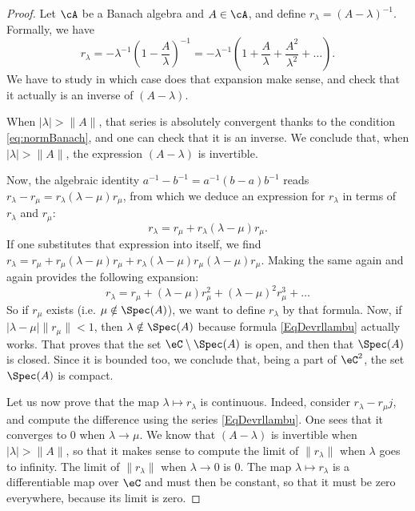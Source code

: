 \begin{proof}
	Let $\cA$ be a Banach algebra and $A\in\cA$, and define $r_{\lambda}=(A-\lambda)^{-1}$. Formally, we have
	\[ 
	  r_{\lambda}=-\lambda^{-1}\left( 1-\frac{ A }{ \lambda } \right)^{-1}=-\lambda^{-1}\left( 1+\frac{ A }{ \lambda }+\frac{ A^2 }{ \lambda^2 }+\ldots \right).
	\]
	We have to study in which case does that expansion make sense, and check that it actually is an inverse of $(A-\lambda)$. 

	When $| \lambda |>\| A \|$, that series is absolutely convergent thanks to the condition \eqref{eq:normBanach}, and one can check that it is an inverse. We conclude that, when $| \lambda |>\| A \|$, the expression $(A-\lambda)$ is invertible.

	Now, the algebraic identity $a^{-1}-b^{-1}=a^{-1}(b-a)b^{-1}$ reads $r_{\lambda}-r_{\mu}=r_{\lambda}(\lambda-\mu)r_{\mu}$, from which we deduce an expression for $r_{\lambda}$ in terms of $r_{\lambda}$ and $r_{\mu}$:
	\[ 
	  r_{\lambda}=r_{\mu}+r_{\lambda}(\lambda-\mu)r_{\mu}.
	\]
	If one substitutes that expression into itself, we find $r_{\lambda}=r_{\mu}+r_{\mu}(\lambda-\mu)r_{\mu}+r_{\lambda}(\lambda-\mu)r_{\mu}(\lambda-\mu)r_{\mu}$. Making the same again and again provides the following expansion: 
	\begin{equation}		\label{EqDevrllambu}
		r_{\lambda}=r_{\mu}+(\lambda-\mu)r_{\mu}^2+(\lambda-\mu)^2r_{\mu}^3+\ldots
	\end{equation}
	So if $r_{\mu}$ exists (i.e. $\mu\notin\Spec(A)$), we want to define $r_{\lambda}$ by that formula. Now, if $| \lambda-\mu |\| r_{\mu} \|<1$, then $\lambda\notin\Spec(A)$ because formula \eqref{EqDevrllambu} actually works. That proves that the set $\eC\setminus\Spec(A)$ is open, and then that $\Spec(A)$ is closed. Since it is bounded too, we conclude that, being a part of $\eC^2$, the set $\Spec(A)$ is compact.

	Let us now prove that the map $\lambda\mapsto r_{\lambda}$ is continuous. Indeed, consider $r_{\lambda}-r_{\mu}j$, and compute the difference using the series \eqref{EqDevrllambu}. One sees that it converges to $0$ when $\lambda\to\mu$. We know that $(A-\lambda)$ is invertible when $| \lambda |>\| A \|$, so that it makes sense to compute the limit of $\| r_{\lambda} \|$ when $\lambda$ goes to infinity. The limit of $\| r_{\lambda} \|$ when $\lambda\to 0$ is $0$. The map $\lambda\mapsto r_{\lambda}$ is a differentiable map over $\eC$ and must then be constant, so that it must be zero everywhere, because its limit is zero.


\end{proof}
